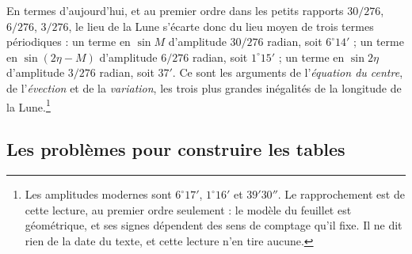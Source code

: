\documentclass[11pt,a4paper]{article}
\begin{document}
En termes d'aujourd'hui, et au premier ordre dans les petits rapports
$30/276$, $6/276$, $3/276$, le lieu de la Lune s'écarte donc du lieu moyen de
trois termes périodiques : un terme en $\sin M$ d'amplitude $30/276$ radian,
soit $6^\circ 14'$ ; un terme en $\sin(2\eta - M)$ d'amplitude $6/276$ radian,
soit $1^\circ 15'$ ; un terme en $\sin 2\eta$ d'amplitude $3/276$ radian, soit
$37'$. Ce sont les arguments de l'\emph{équation du centre}, de l'\emph{évection} et
de la \emph{variation}, les trois plus grandes inégalités de la longitude de la
Lune.\footnote{Les amplitudes modernes sont $6^\circ 17'$, $1^\circ 16'$ et $39'30''$.
Le rapprochement est de cette lecture, au premier ordre seulement : le modèle du
feuillet est géométrique, et ses signes dépendent des sens de comptage qu'il
fixe. Il ne dit rien de la date du texte, et cette lecture n'en tire aucune.}

\subsection*{Les problèmes pour construire les tables}
\end{document}
